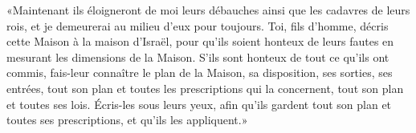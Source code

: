 «Maintenant ils éloigneront de moi leurs débauches ainsi que les cadavres de leurs rois,
	et je demeurerai au milieu d’eux pour toujours.
Toi, fils d’homme, décris cette Maison à la maison d’Israël,
	pour qu’ils soient honteux de leurs fautes en mesurant les dimensions de la Maison.
S’ils sont honteux de tout ce qu’ils ont commis,
	fais-leur connaître le plan de la Maison, sa disposition,
	ses sorties, ses entrées, tout son plan et toutes les prescriptions qui la concernent,
	tout son plan et toutes ses lois.
Écris-les sous leurs yeux, afin qu’ils gardent tout son plan et toutes ses prescriptions,
	et qu’ils les appliquent.»
